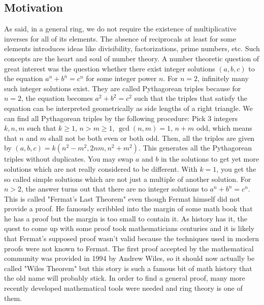 \subsection{Motivation}
As said, in a general ring, we do not require the existence of multiplicative inverses for all of its elements. The absence of reciprocals at least for some elements introduces ideas like divisibility, factorizations, prime numbers, etc. Such concepts are the heart and soul of number theory. A number theoretic question of great interest was the question whether there exist integer solutions $(a,b,c)$ to the equation $a^n + b^n = c^n$ for some integer power $n$. For $n=2$, infinitely many such integer solutions exist. They are called Pythagorean triples because for $n=2$, the equation becomes $a^2 + b^2 = c^2$ such that the triples that satisfy the equation can be interpreted geometrically as side lengths of a right triangle. We can find all Pythagorean triples by the following procedure: Pick 3 integers $k,n,m$ such that $k \geq 1$, $n > m \geq 1$, $\gcd(n,m) = 1$, $n + m$ odd, which means that $n$ and $m$ shall not be both even or both odd. Then, all the triples are given by $(a,b,c) = k (n^2 - m^2, 2 n m, n^2 + m^2)$. This generates all the Pythagorean triples without duplicates. You may swap $a$ and $b$ in the solutions to get yet more solutions which are not really considered to be different. With $k=1$, you get the so called simple solutions which are not just a multiple of another solution. For $n > 2$, the answer turns out that there are no integer solutions to $a^n + b^n = c^n$. This is called "Fermat's Last Theorem" even though Fermat himself did not provide a proof. He famously scribbled into the margin of some math book that he has a proof but the margin is too small to contain it. As history has it, the quest to come up with some proof took mathematicians centuries and it is likely that Fermat's supposed proof wasn't valid because the techniques used in modern proofs were not known to Fermat. The first proof accepted by the mathematical community was provided in 1994 by Andrew Wiles, so it should now actually be called "Wiles Theorem" but this story is such a famous bit of math history that the old name will probably stick. In order to find a general proof, many more recently developed mathematical tools were needed and ring theory is one of them. 


